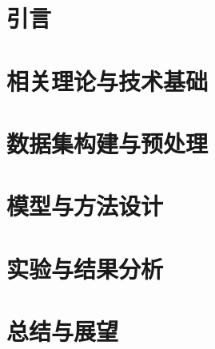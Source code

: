 \documentclass[
    decl-page,  %
  ]{njuthesis}
\begin{document}
\mainmatter



\chapter{引言}


\chapter{相关理论与技术基础}


\chapter{数据集构建与预处理}


\chapter{模型与方法设计}


\chapter{实验与结果分析}


\chapter{总结与展望}

\end{document}

